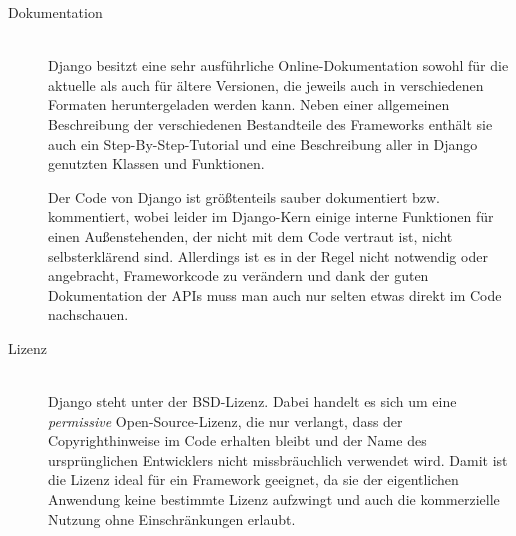 \begin{description}
\item[Dokumentation] \hfill \\
Django besitzt eine sehr ausführliche Online-Dokumentation sowohl für die aktuelle als auch für
ältere Versionen, die jeweils auch in verschiedenen Formaten heruntergeladen werden kann. Neben
einer allgemeinen Beschreibung der verschiedenen Bestandteile des Frameworks enthält sie auch ein
Step-By-Step-Tutorial und eine Beschreibung aller in Django genutzten Klassen und Funktionen.

Der Code von Django ist größtenteils sauber dokumentiert bzw. kommentiert, wobei leider im
Django-Kern einige interne Funktionen für einen Außenstehenden, der nicht mit dem Code vertraut ist,
nicht selbsterklärend sind. Allerdings ist es in der Regel nicht notwendig oder angebracht,
Frameworkcode zu verändern und dank der guten Dokumentation der APIs muss man auch nur selten etwas
direkt im Code nachschauen.


\item[Lizenz] \hfill \\
Django steht unter der BSD-Lizenz. Dabei handelt es sich um eine \emph{permissive}
Open-Source-Lizenz, die nur verlangt, dass der Copyrighthinweise im Code erhalten bleibt und der
Name des ursprünglichen Entwicklers nicht missbräuchlich verwendet wird. Damit ist die Lizenz ideal
für ein Framework geeignet, da sie der eigentlichen Anwendung keine bestimmte Lizenz aufzwingt und
auch die kommerzielle Nutzung ohne Einschränkungen erlaubt.


\end{description}
